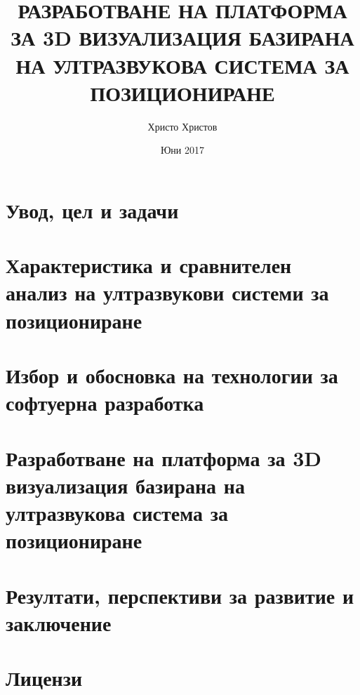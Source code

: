 \documentclass{article}
\title{РАЗРАБОТВАНЕ НА ПЛАТФОРМА ЗА 3D ВИЗУАЛИЗАЦИЯ БАЗИРАНА НА УЛТРАЗВУКОВА СИСТЕМА ЗА ПОЗИЦИОНИРАНЕ}
\author{Христо Христов}
\date{Юни 2017}
\begin{document}
\maketitle



\pagebreak

\tableofcontents

\pagebreak
\section{Увод, цел и задачи}


    
\pagebreak
\section{Характеристика и сравнителен анализ на ултразвукови системи за позициониране}



\pagebreak
\section{Избор и обосновка на технологии за софтуерна разработка}


\pagebreak
\section{Разработване на платформа за 3D визуализация базирана на ултразвукова система за позициониране}


\pagebreak
\section{Резултати, перспективи за развитие и заключение}


\pagebreak
\section{Лицензи}


\printbibliography
\end{document}
